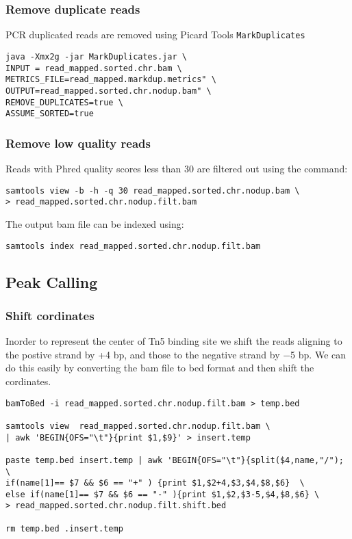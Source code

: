 \documentclass[10pt]{article}
\newcommand{\prog}[1]{\texttt{#1}}
\begin{document}
\subsubsection{Remove duplicate reads} PCR duplicated reads are removed using Picard Tools \prog{MarkDuplicates}
\begin{verbatim}
java -Xmx2g -jar MarkDuplicates.jar \
INPUT = read_mapped.sorted.chr.bam \
METRICS_FILE=read_mapped.markdup.metrics" \
OUTPUT=read_mapped.sorted.chr.nodup.bam" \
REMOVE_DUPLICATES=true \
ASSUME_SORTED=true
\end{verbatim}
\subsubsection{Remove low quality reads} Reads with Phred quality scores less than 30 are filtered out using the command:
\begin{verbatim}
samtools view -b -h -q 30 read_mapped.sorted.chr.nodup.bam \
> read_mapped.sorted.chr.nodup.filt.bam
\end{verbatim}
The output bam file can be indexed using:
\begin{verbatim}
samtools index read_mapped.sorted.chr.nodup.filt.bam
\end{verbatim} 
\subsection{Peak Calling}
\subsubsection{Shift cordinates} Inorder to represent the center of Tn5 binding site we shift the reads aligning to the postive strand by +4 bp, and those to the negative strand by −5 bp. We can do this easily by converting the bam file to bed format and then shift the cordinates.
\begin{verbatim}
bamToBed -i read_mapped.sorted.chr.nodup.filt.bam > temp.bed

samtools view  read_mapped.sorted.chr.nodup.filt.bam \
| awk 'BEGIN{OFS="\t"}{print $1,$9}' > insert.temp

paste temp.bed insert.temp | awk 'BEGIN{OFS="\t"}{split($4,name,"/"); \
if(name[1]== $7 && $6 == "+" ) {print $1,$2+4,$3,$4,$8,$6}  \
else if(name[1]== $7 && $6 == "-" ){print $1,$2,$3-5,$4,$8,$6} \
> read_mapped.sorted.chr.nodup.filt.shift.bed

rm temp.bed .insert.temp
\end{verbatim}
\end{document}
